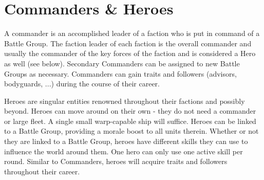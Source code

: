 \section{Commanders \& Heroes}
A commander is an accomplished leader of a faction who is put in command of a Battle Group. The faction leader of each faction is the overall commander and usually the commander of the key forces of the faction and is considered a Hero as well (see below).
Secondary Commanders can be assigned to new Battle Groups as necessary. Commanders can gain traits and followers (advisors, bodyguards, ...) during the course of their career.

Heroes are singular entities renowned throughout their factions and possibly beyond. Heroes can move around on their own - they do not need a commander or large fleet. A single small warp-capable ship will suffice.
Heroes can be linked to a Battle Group, providing a morale boost to all units therein. 
Whether or not they are linked to a Battle Group, heroes have different skills they can use to influence the world around them.
One hero can only use one active skill per round.
Similar to Commanders, heroes will acquire traits and followers throughout their career.


